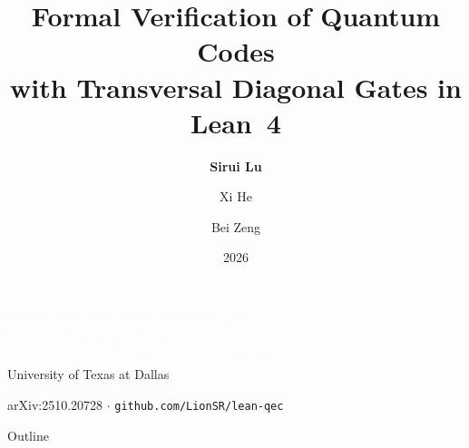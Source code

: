 \documentclass[aspectratio=169,t,10pt]{beamer}
\title{Formal Verification of Quantum Codes\\
  with Transversal Diagonal Gates in Lean~4}
\author{\textbf{Sirui Lu} \and Xi He \and Bei Zeng}
\institute{University of Texas at Dallas}
\date{2026}
\begin{document}
{
\begin{frame}
\vfill
\begin{center}
{\Large\bfseries\textcolor{white}{Formal Verification of Quantum Codes}\\
\textcolor{white}{with Transversal Diagonal Gates in Lean~4}}

\vspace{1.2em}
{\small\textcolor{Teal!60!white}{University of Texas at Dallas}}

\vspace{1.5em}
{\footnotesize\textcolor{Slate!40!white}{%
  arXiv:2510.20728 \quad$\cdot$\quad
  \texttt{github.com/LionSR/lean-qec}}}
\end{center}
\vfill
\end{frame}
}

\begin{frame}{Outline}
\tableofcontents[hideallsubsections]
\end{frame}
\end{document}
